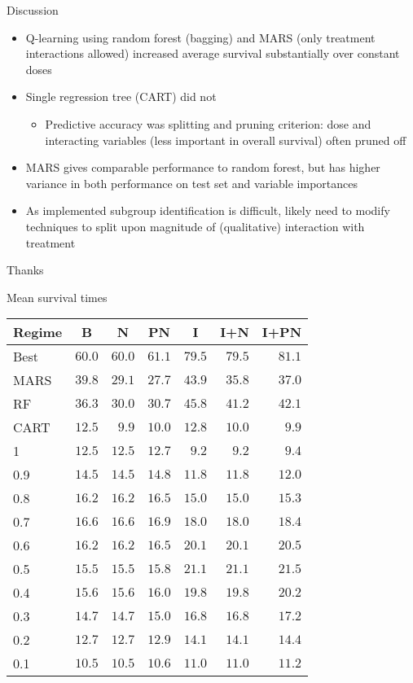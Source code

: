 \documentclass{beamer}
\begin{document}
\begin{frame}[t]{Discussion}
  \begin{itemize}[<+->]
    \item Q-learning using random forest (bagging) and MARS (only treatment interactions allowed) increased average survival substantially over constant doses
    \item Single regression tree (CART) did not
    \begin{itemize}
      \item Predictive accuracy was splitting and pruning criterion: dose and interacting variables (less important in overall survival) often pruned off 
    \end{itemize}
    \item MARS gives comparable performance to random forest, but has higher variance in both performance on test set and variable importances 
    \item As implemented subgroup identification is difficult, likely need to modify techniques to split upon magnitude of (qualitative) interaction with treatment 
  \end{itemize}
\end{frame}



\begin{frame}[standout]
  Thanks
\end{frame}

\appendix

\begin{frame}[c]{Mean survival times}
  \begin{table}
  \small
  \centering
  \begin{tabular}{lrrrrrr}
  \toprule \multicolumn{1}{c}{Regime}&\multicolumn{1}{c}{B}&\multicolumn{1}{c}{N}&\multicolumn{1}{c}{PN}&\multicolumn{1}{c}{I}&\multicolumn{1}{c}{I+N}&\multicolumn{1}{c}{I+PN}\tabularnewline
  \midrule
  Best&$60.0$&$60.0$&$61.1$&$79.5$&$79.5$&$81.1$\tabularnewline
  MARS&$39.8$&$29.1$&$27.7$&$43.9$&$35.8$&$37.0$\tabularnewline
  RF&$36.3$&$30.0$&$30.7$&$45.8$&$41.2$&$42.1$\tabularnewline
  CART&$12.5$&$ 9.9$&$10.0$&$12.8$&$10.0$&$ 9.9$\tabularnewline
  1&$12.5$&$12.5$&$12.7$&$ 9.2$&$ 9.2$&$ 9.4$\tabularnewline
  0.9&$14.5$&$14.5$&$14.8$&$11.8$&$11.8$&$12.0$\tabularnewline
  0.8&$16.2$&$16.2$&$16.5$&$15.0$&$15.0$&$15.3$\tabularnewline
  0.7&$16.6$&$16.6$&$16.9$&$18.0$&$18.0$&$18.4$\tabularnewline
  0.6&$16.2$&$16.2$&$16.5$&$20.1$&$20.1$&$20.5$\tabularnewline
  0.5&$15.5$&$15.5$&$15.8$&$21.1$&$21.1$&$21.5$\tabularnewline
  0.4&$15.6$&$15.6$&$16.0$&$19.8$&$19.8$&$20.2$\tabularnewline
  0.3&$14.7$&$14.7$&$15.0$&$16.8$&$16.8$&$17.2$\tabularnewline
  0.2&$12.7$&$12.7$&$12.9$&$14.1$&$14.1$&$14.4$\tabularnewline
  0.1&$10.5$&$10.5$&$10.6$&$11.0$&$11.0$&$11.2$\tabularnewline
  \bottomrule
  \end{tabular}
  \end{table}
\end{frame}
\end{document}
